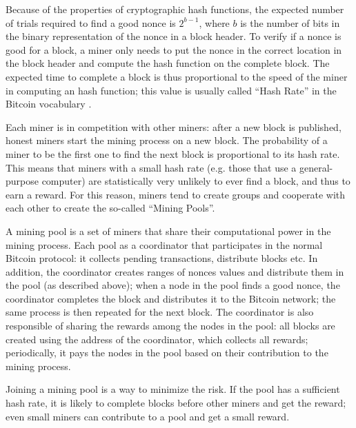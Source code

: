 Because of the properties of cryptographic hash functions, the expected number of trials required to find a good nonce is $2^{b - 1}$, where $b$ is the number of bits in the binary representation of the nonce in a block header.
To verify if a nonce is good for a block, a miner only needs to put the nonce in the correct location in the block header and compute the hash function on the complete block.
The expected time to complete a block is thus proportional to the speed of the miner in computing an hash function; this value is usually called ``Hash Rate''
in the Bitcoin vocabulary \cite{bitcoin_vocabulary}.

Each miner is in competition with other miners:
after a new block is published, honest miners start the mining process on a new block.
The probability of a miner to be the first one to find the next block is proportional to its hash rate.
This means that miners with a small hash rate (e.g. those that use a general-purpose computer) are statistically very unlikely to ever find a block, and thus to earn a reward.
For this reason, miners tend to create groups and cooperate with each other to create the so-called ``Mining Pools''.

\bigskip
A mining pool is a set of miners that share their computational power in the mining process.
Each pool as a coordinator that participates in the normal Bitcoin protocol:
it collects pending transactions, distribute blocks etc.
In addition, the coordinator creates ranges of nonces values and distribute them in the pool (as described above);
when a node in the pool finds a good nonce, the coordinator completes the block and distributes it to the Bitcoin network;
the same process is then repeated for the next block.
The coordinator is also responsible of sharing the rewards among the nodes in the pool:
all blocks are created using the address of the coordinator, which collects all rewards;
periodically, it pays the nodes in the pool based on their contribution to the mining process.

Joining a mining pool is a way to minimize the risk.
If the pool has a sufficient hash rate, it is likely to complete blocks before other miners and get the reward;
even small miners can contribute to a pool and get a small reward.

